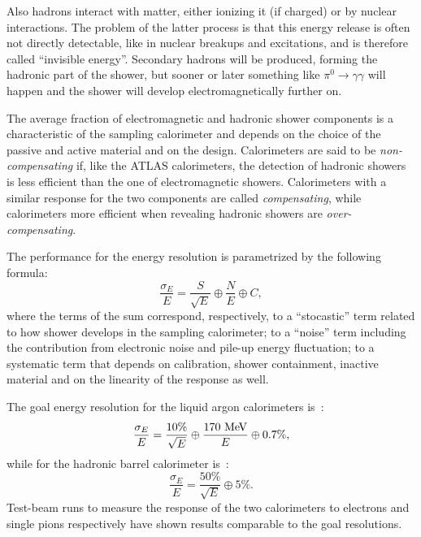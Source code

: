 Also hadrons interact with matter, either ionizing it (if charged) or by nuclear interactions.
The problem of the latter process is that this energy release is often not directly detectable,
like in nuclear breakups and excitations, and is therefore called ``invisible energy''.
Secondary hadrons will be produced, forming the hadronic part of the shower, but sooner
or later something like $\pi^0\to \gamma\gamma$ will happen and the shower will
develop electromagnetically further on.

The average fraction of electromagnetic and hadronic shower components is a characteristic
of the sampling calorimeter and depends on the choice of the passive and active material
and on the design. Calorimeters are said to be {\it non-compensating} if, like the ATLAS
calorimeters, the detection of hadronic showers is less efficient than the one of 
electromagnetic showers. Calorimeters with a similar response for the two components
are called  {\it compensating}, while calorimeters more efficient when revealing
hadronic showers are  {\it over-compensating}.


The performance for the energy resolution is parametrized by the following formula:
\begin{equation}\label{eq:resolution}
\frac{\sigma_{E}}{E} = \frac{S}{\sqrt{E}}\oplus\frac{N}{E}\oplus C,
\end{equation} 
where the terms of the sum correspond, respectively, to a ``stocastic'' term related to how shower develops in the sampling calorimeter; to a ``noise''
term including the contribution from electronic noise and pile-up energy fluctuation; 
to a systematic term that depends on calibration, shower containment, inactive material and on the
linearity of the response as well. 

The goal energy resolution for the liquid argon calorimeters is~\cite{lar_readiness}:
\begin{equation}
\frac{\sigma_{E}}{E}=\frac{10\%}{\sqrt{E}} \oplus\frac{170\MeV}{E} \oplus 0.7\%,
\end{equation}
while for the hadronic barrel calorimeter is~\cite{tile_readiness}:
\begin{equation}
\frac{\sigma_{E}}{E}=\frac{50\%}{\sqrt{E}} \oplus 5\%.
\end{equation}
Test-beam runs to measure the response of the two calorimeters to electrons
and single pions respectively have shown results comparable to the goal resolutions.


